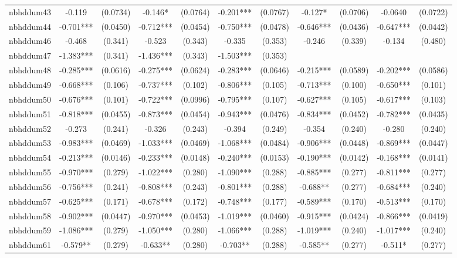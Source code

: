 \documentclass[]{article}
\begin{document}
\begin{tabular}{lcccccccccc}
nbhddum43 & -0.119 & (0.0734) & -0.146* & (0.0764) & -0.201*** & (0.0767) & -0.127* & (0.0706) & -0.0640 & (0.0722) \\
nbhddum44 & -0.701*** & (0.0450) & -0.712*** & (0.0454) & -0.750*** & (0.0478) & -0.646*** & (0.0436) & -0.647*** & (0.0442) \\
nbhddum46 & -0.468 & (0.341) & -0.523 & (0.343) & -0.335 & (0.353) & -0.246 & (0.339) & -0.134 & (0.480) \\
nbhddum47 & -1.383*** & (0.341) & -1.436*** & (0.343) & -1.503*** & (0.353) &  &  &  &  \\
nbhddum48 & -0.285*** & (0.0616) & -0.275*** & (0.0624) & -0.283*** & (0.0646) & -0.215*** & (0.0589) & -0.202*** & (0.0586) \\
nbhddum49 & -0.668*** & (0.106) & -0.737*** & (0.102) & -0.806*** & (0.105) & -0.713*** & (0.100) & -0.650*** & (0.101) \\
nbhddum50 & -0.676*** & (0.101) & -0.722*** & (0.0996) & -0.795*** & (0.107) & -0.627*** & (0.105) & -0.617*** & (0.103) \\
nbhddum51 & -0.818*** & (0.0455) & -0.873*** & (0.0454) & -0.943*** & (0.0476) & -0.834*** & (0.0452) & -0.782*** & (0.0435) \\
nbhddum52 & -0.273 & (0.241) & -0.326 & (0.243) & -0.394 & (0.249) & -0.354 & (0.240) & -0.280 & (0.240) \\
nbhddum53 & -0.983*** & (0.0469) & -1.033*** & (0.0469) & -1.068*** & (0.0484) & -0.906*** & (0.0448) & -0.869*** & (0.0447) \\
nbhddum54 & -0.213*** & (0.0146) & -0.233*** & (0.0148) & -0.240*** & (0.0153) & -0.190*** & (0.0142) & -0.168*** & (0.0141) \\
nbhddum55 & -0.970*** & (0.279) & -1.022*** & (0.280) & -1.090*** & (0.288) & -0.885*** & (0.277) & -0.811*** & (0.277) \\
nbhddum56 & -0.756*** & (0.241) & -0.808*** & (0.243) & -0.801*** & (0.288) & -0.688** & (0.277) & -0.684*** & (0.240) \\
nbhddum57 & -0.625*** & (0.171) & -0.678*** & (0.172) & -0.748*** & (0.177) & -0.589*** & (0.170) & -0.513*** & (0.170) \\
nbhddum58 & -0.902*** & (0.0447) & -0.970*** & (0.0453) & -1.019*** & (0.0460) & -0.915*** & (0.0424) & -0.866*** & (0.0419) \\
nbhddum59 & -1.086*** & (0.279) & -1.050*** & (0.280) & -1.066*** & (0.288) & -1.019*** & (0.240) & -1.017*** & (0.240) \\
nbhddum61 & -0.579** & (0.279) & -0.633** & (0.280) & -0.703** & (0.288) & -0.585** & (0.277) & -0.511* & (0.277) \\

\end{tabular}
\end{document}
